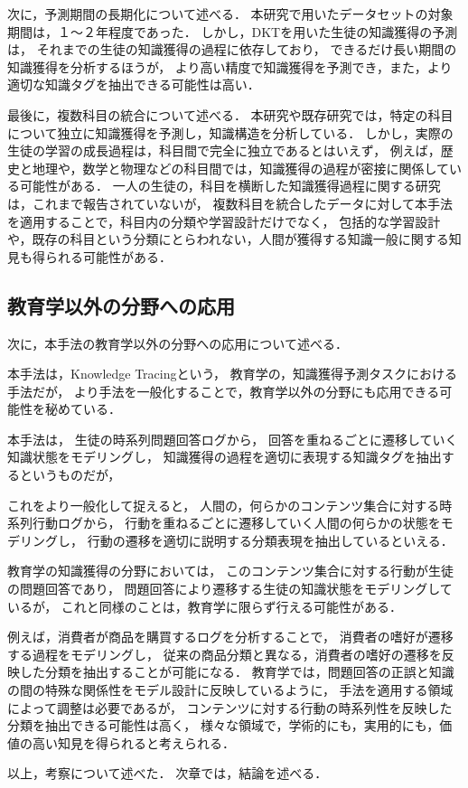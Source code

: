 次に，予測期間の長期化について述べる．
本研究で用いたデータセットの対象期間は，１〜２年程度であった．
しかし，DKTを用いた生徒の知識獲得の予測は，
それまでの生徒の知識獲得の過程に依存しており，
できるだけ長い期間の知識獲得を分析するほうが，
より高い精度で知識獲得を予測でき，また，より適切な知識タグを抽出できる可能性は高い．


最後に，複数科目の統合について述べる．
本研究や既存研究では，特定の科目について独立に知識獲得を予測し，知識構造を分析している．
しかし，実際の生徒の学習の成長過程は，科目間で完全に独立であるとはいえず，
例えば，歴史と地理や，数学と物理などの科目間では，知識獲得の過程が密接に関係している可能性がある．
一人の生徒の，科目を横断した知識獲得過程に関する研究は，これまで報告されていないが，
複数科目を統合したデータに対して本手法を適用することで，科目内の分類や学習設計だけでなく，
包括的な学習設計や，既存の科目という分類にとらわれない，人間が獲得する知識一般に関する知見も得られる可能性がある．



\subsection{教育学以外の分野への応用}
次に，本手法の教育学以外の分野への応用について述べる．

本手法は，Knowledge Tracingという，
教育学の，知識獲得予測タスクにおける手法だが，
より手法を一般化することで，教育学以外の分野にも応用できる可能性を秘めている．

本手法は，
生徒の時系列問題回答ログから，
回答を重ねるごとに遷移していく知識状態をモデリングし，
知識獲得の過程を適切に表現する知識タグを抽出するというものだが，

これをより一般化して捉えると，
人間の，何らかのコンテンツ集合に対する時系列行動ログから，
行動を重ねるごとに遷移していく人間の何らかの状態をモデリングし，
行動の遷移を適切に説明する分類表現を抽出しているといえる．

教育学の知識獲得の分野においては，
このコンテンツ集合に対する行動が生徒の問題回答であり，
問題回答により遷移する生徒の知識状態をモデリングしているが，
これと同様のことは，教育学に限らず行える可能性がある．

例えば，消費者が商品を購買するログを分析することで，
消費者の嗜好が遷移する過程をモデリングし，
従来の商品分類と異なる，消費者の嗜好の遷移を反映した分類を抽出することが可能になる．
教育学では，問題回答の正誤と知識の間の特殊な関係性をモデル設計に反映しているように，
手法を適用する領域によって調整は必要であるが，
コンテンツに対する行動の時系列性を反映した分類を抽出できる可能性は高く，
様々な領域で，学術的にも，実用的にも，価値の高い知見を得られると考えられる．




\vvspace
以上，考察について述べた．
次章では，結論を述べる．
